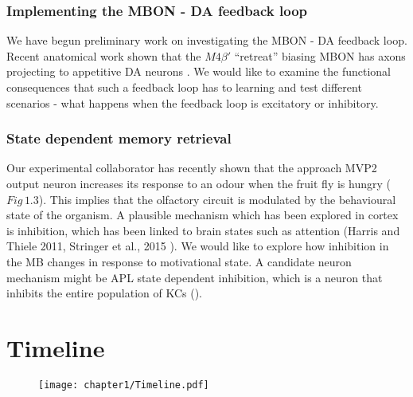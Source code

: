 \subsection{Implementing the MBON - DA feedback loop}

We have begun preliminary work on investigating the MBON - DA feedback
loop. Recent anatomical work shown that the $M4\beta'$ ``retreat''
biasing MBON has axons projecting to appetitive DA neurons \citep{Owald:2015cn}.
We would like to examine the functional consequences that such a feedback
loop has to learning and test different scenarios - what happens when
the feedback loop is excitatory or inhibitory.


\subsection{State dependent memory retrieval }

Our experimental collaborator has recently shown that the approach
MVP2 output neuron increases its response to an odour when the fruit
fly is hungry ($Fig\,1.3$). This implies that the olfactory circuit
is modulated by the behavioural state of the organism. A plausible
mechanism which has been explored in cortex is inhibition, which has
been linked to brain states such as attention (Harris and Thiele 2011,
Stringer et al., 2015 ). We would like to explore how inhibition in
the MB changes in response to motivational state. A candidate neuron
mechanism might be APL state dependent inhibition, which is a neuron
that inhibits the entire population of KCs (\citealp{Lin:2014io}). 

\chapter{Timeline}

\begin{figure}[H]
%
\texttt{[image: chapter1/Timeline.pdf]}%
\end{figure}
%

